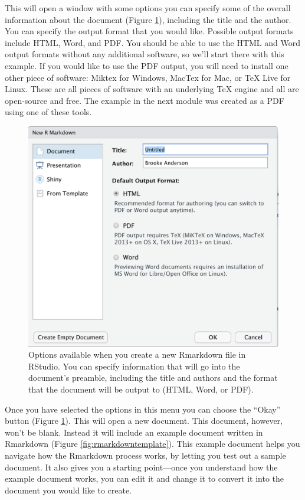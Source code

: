 \documentclass[]{tufte-book}
\begin{document}
This will open a window with some options you can specify some of the overall
information about the document (Figure \ref{fig:rmarkdownchoices}), including
the title and the author. You can specify the output format that you would
like. Possible output formats include HTML, Word, and PDF. You should be able to
use the HTML and Word output formats without any additional software, so we'll start
there with this example. If you
would like to use the PDF output, you will need to install one other piece of
software: Miktex for Windows, MacTex for Mac, or TeX Live for Linux. These are
all pieces of software with an underlying TeX engine and all are open-source and
free. The example in the next module was created as a PDF using one of these tools.

\begin{figure}
\includegraphics[width=\textwidth]{figures/rmarkdown_choices} \caption[Options available when you create a new Rmarkdown file in RStudio]{Options available when you create a new Rmarkdown file in RStudio. You can specify information that will go into the document's preamble, including the title and authors and the format that the document will be output to (HTML, Word, or PDF).}\label{fig:rmarkdownchoices}
\end{figure}

Once you have selected the options in this menu you can choose the ``Okay'' button
(Figure \ref{fig:rmarkdownchoices}). This will open a new document. This
document, however, won't be blank. Instead it will include an example document
written in Rmarkdown (Figure \ref{fig:rmarkdowntemplate}). This example
document helps you navigate how the Rmarkdown process works, by letting you test
out a sample document. It also gives you a starting point---once you understand
how the example document works, you can edit it and change it to convert it
into the document you would like to create.
\end{document}
